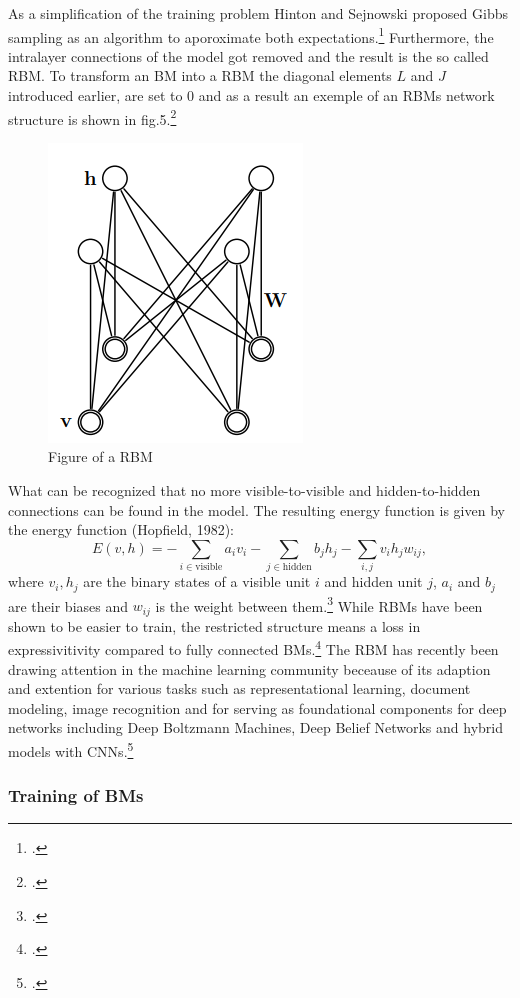As a simplification of the training problem Hinton and Sejnowski proposed Gibbs sampling as an algorithm to aporoximate both expectations.\footcite[cf.][158-165]{ackleyLearningAlgorithmBoltzmann1985}
Furthermore, the intralayer connections of the model got removed and the result is the so called \ac{RBM}.
To transform an \ac{BM} into a \ac{RBM} the diagonal elements \( L \) and \( J \)  introduced earlier, are set to 0 and as a result an exemple of an \ac{RBM}s network structure is shown in fig.5.\footcite[cf.][449]{salakhutdinovDeepBoltzmannMachines2009}

\begin{figure}[H]
    \centering
    \includegraphics[width=0.25\linewidth]{graphics/RBM_Modell.png}
    \caption{Figure of a \ac{RBM}}
\end{figure}
What can be recognized that no more visible-to-visible and hidden-to-hidden connections can be found in the model.
The resulting energy function is given by the energy function (Hopfield, 1982):
\begin{equation}
E(v, h) = - \sum_{i \in \text{visible}} a_i v_i - \sum_{j \in \text{hidden}} b_j h_j - \sum_{i,j} v_i h_j w_{ij},
\end{equation}
where \( v_i, h_j \) are the binary states of a visible unit \( i \) and hidden unit \( j \), \( a_i \) and  \(  b_j \) are their biases and \( w_{ij} \) is the weight between them.\footcite[cf.][3-4]{hintonPracticalGuideTraining2012a}
While \ac{RBM}s have been shown to be easier to train, the restricted structure means a loss in expressivitivity compared to fully connected \ac{BM}s.\footcite[cf.][4]{huembeliPhysicsEnergybasedModels2022}
The \ac{RBM} has recently been drawing attention in the machine learning community beceause of its adaption and extention for various tasks such as representational learning, document modeling, image recognition and for
serving as foundational components for deep networks including Deep Boltzmann Machines, Deep Belief Networks and hybrid models with CNNs.\footcite[cf.][1186]{zhangOverviewRestrictedBoltzmann2018}

\subsubsection{Training of \ac{BM}s}

